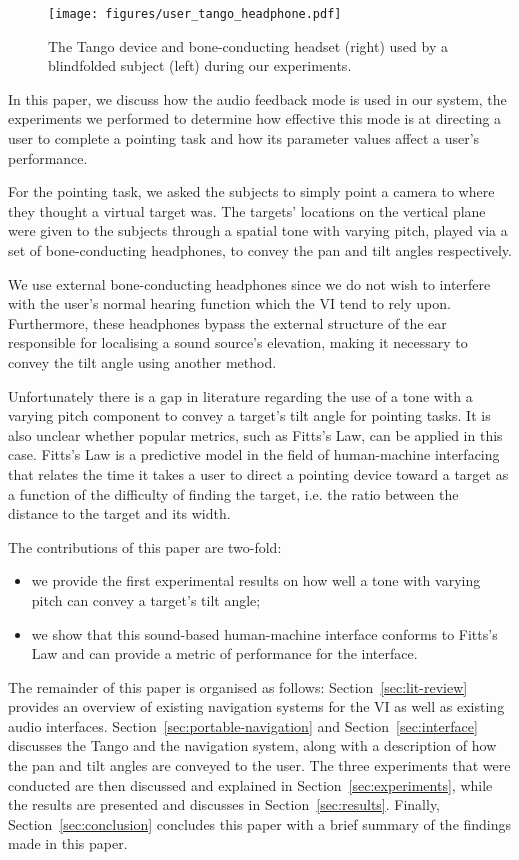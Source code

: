 \documentclass[format=sigconf, review=true, screen=true, anonymous=true]{acmart}
\begin{document}
\begin{figure}
  \centering
  \texttt{[image: figures/user\_tango\_headphone.pdf]}
  \caption{The Tango device and bone-conducting headset (right) used by a blindfolded subject (left) during our experiments. }
  \label{fig:tango}
\end{figure}

In this paper, we discuss how the audio feedback mode is used in our system, the experiments we performed to determine how effective this mode is at directing a user to complete a pointing task and how its parameter values affect a user's performance. 

For the pointing task, we asked the subjects to simply point a camera to where they thought a virtual target was. The targets' locations on the vertical plane were given to the subjects through a spatial tone with varying pitch, played via a set of bone-conducting headphones, to convey the pan and tilt angles respectively. 

We use external bone-conducting headphones since we do not wish to interfere with the user's normal hearing function which the VI tend to rely upon. Furthermore, these headphones bypass the external structure of the ear responsible for localising a sound source's elevation, making it necessary to convey the tilt angle using another method. 

Unfortunately there is a gap in literature regarding the use of a tone with a varying pitch component to convey a target's tilt angle for pointing tasks. It is also unclear whether popular metrics, such as Fitts's Law, can be applied in this case. Fitts's Law is a predictive model in the field of human-machine interfacing that relates the time it takes a user to direct a pointing device toward a target as a function of the difficulty of finding the target, i.e. the ratio between the distance to the target and its width. 

The contributions of this paper are two-fold: 

\begin{itemize}
  \item we provide the first experimental results on how well a tone with varying pitch can convey a target's tilt angle; 
  \item we show that this sound-based human-machine interface conforms to Fitts's Law and can provide a metric of performance for the interface.
\end{itemize}

The remainder of this paper is organised as follows: Section~\ref{sec:lit-review} provides an overview of existing navigation systems for the VI as well as existing audio interfaces. Section~\ref{sec:portable-navigation} and Section~\ref{sec:interface} discusses the Tango and the navigation system, along with a description of how the pan and tilt angles are conveyed to the user. The three experiments that were conducted are then discussed and explained in Section~\ref{sec:experiments}, while the results are presented and discusses in Section~\ref{sec:results}. Finally, Section~\ref{sec:conclusion} concludes this paper with a brief summary of the findings made in this paper. 
\end{document}
